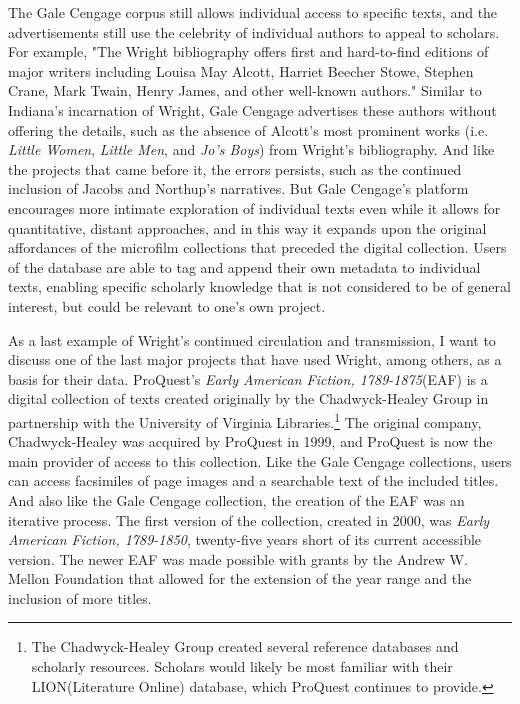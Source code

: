 The Gale Cengage corpus still allows individual access to specific texts, and the advertisements still use the celebrity of individual authors to appeal to scholars. For example, "The Wright bibliography offers first and hard-to-find editions of major writers including Louisa May Alcott, Harriet Beecher Stowe, Stephen Crane, Mark Twain, Henry James, and other well-known authors."\autocite{noauthor_american_nodate} Similar to Indiana's incarnation of Wright, Gale Cengage advertises these authors without offering the details, such as the absence of Alcott's most prominent works (i.e. \textit{Little Women}, \textit{Little Men}, and \textit{Jo's Boys}) from Wright's bibliography. And like the projects that came before it, the errors persists, such as the continued inclusion of Jacobs and Northup's narratives. But Gale Cengage's platform encourages more intimate exploration of individual texts even while it allows for quantitative, distant approaches, and in this way it expands upon the original affordances of the microfilm collections that preceded the digital collection. Users of the database are able to tag and append their own metadata to individual texts, enabling specific scholarly knowledge that is not considered to be of general interest, but could be relevant to one's own project. 

As a last example of Wright's continued circulation and transmission, I want to discuss one of the last major projects that have used Wright, among others, as a basis for their data. ProQuest's \textit{Early American Fiction, 1789-1875}(EAF) is a digital collection of texts created originally by the Chadwyck-Healey Group in partnership with the University of Virginia Libraries.\footnote{The Chadwyck-Healey Group created several reference databases and scholarly resources. Scholars would likely be most familiar with their LION(Literature Online) database, which ProQuest continues to provide.} The original company, Chadwyck-Healey was acquired by ProQuest in 1999, and ProQuest is now the main provider of access to this collection. Like the Gale Cengage collections, users can access facsimiles of page images and a searchable text of the included titles. And also like the Gale Cengage collection, the creation of the EAF was an iterative process. The first version of the collection, created in 2000, was \textit{Early American Fiction, 1789-1850}, twenty-five years short of its current accessible version. The newer EAF was made possible with grants by the Andrew W. Mellon Foundation that allowed for the extension of the year range and the inclusion of more titles.\autocite{noauthor_early_nodate-2}

